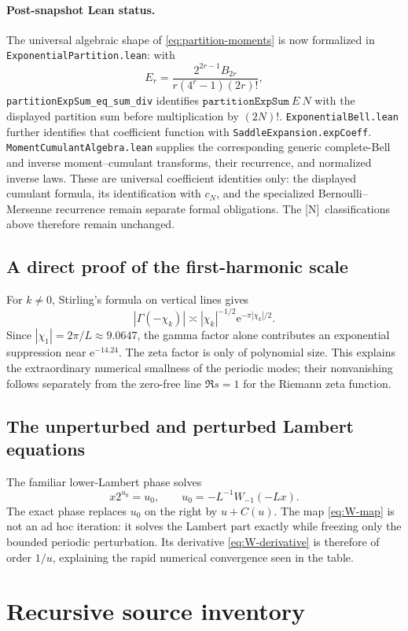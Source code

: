 \documentclass[11pt,oneside]{article}
\theoremstyle{definition}
\theoremstyle{remark}
\newcommand{\e}{\mathrm e}
\newcommand{\statusN}{\textsf{[N]}}
\begin{document}
\paragraph{Post-snapshot Lean status.}
The universal algebraic shape of \eqref{eq:partition-moments} is now
formalized in \texttt{ExponentialPartition.lean}: with
\[
 E_r=\frac{2^{2r-1}B_{2r}}{r(4^r-1)(2r)!},
\]
\texttt{partitionExpSum\_eq\_sum\_div} identifies
\(\texttt{partitionExpSum}\ E\ N\) with the displayed partition sum
before multiplication by \((2N)!\).
\texttt{ExponentialBell.lean} further identifies that coefficient
function with \texttt{SaddleExpansion.expCoeff}.
\texttt{MomentCumulantAlgebra.lean} supplies the corresponding generic
complete-Bell and inverse moment--cumulant transforms, their recurrence,
and normalized inverse laws.  These are universal coefficient identities
only: the displayed cumulant formula, its identification with \(c_N\),
and the specialized Bernoulli--Mersenne recurrence remain separate formal
obligations.  The \statusN\ classifications above therefore remain unchanged.

\subsection{A direct proof of the first-harmonic scale}
For $k\ne0$, Stirling's formula on vertical lines gives
\[
 |\Gamma(-\chi_k)|\asymp |\chi_k|^{-1/2}\e^{-\pi|\chi_k|/2}.
\]
Since $|\chi_1|=2\pi/L\approx9.0647$, the gamma factor alone contributes an exponential
suppression near $\e^{-14.24}$.  The zeta factor is only of polynomial size.  This explains
the extraordinary numerical smallness of the periodic modes; their nonvanishing follows
separately from the zero-free line $\Re s=1$ for the Riemann zeta function.

\subsection{The unperturbed and perturbed Lambert equations}
The familiar lower-Lambert phase solves
\[
 x2^{u_0}=u_0,
 \qquad
 u_0=-L^{-1}W_{-1}(-Lx).
\]
The exact phase replaces $u_0$ on the right by $u+C(u)$.  The map
\eqref{eq:W-map} is not an ad hoc iteration: it solves the Lambert part exactly while
freezing only the bounded periodic perturbation.  Its derivative
\eqref{eq:W-derivative} is therefore of order $1/u$, explaining the rapid numerical
convergence seen in the table.

\section{Recursive source inventory}
\label{app:inventory}
\end{document}
